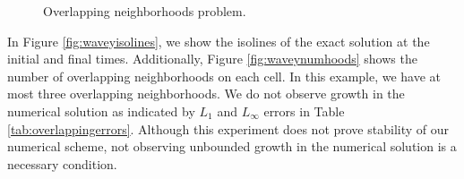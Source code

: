 \begin{figure}
\quad
{}
\caption{Overlapping neighborhoods problem.} \label{fig:overlappingneighborhoods}
\end{figure}

In Figure \ref{fig:waveyisolines}, we show the isolines of the exact solution at the initial and final times.  Additionally, Figure \ref{fig:waveynumhoods} shows the number of overlapping neighborhoods on each cell.  In this example, we have at most three overlapping neighborhoods.  We do not observe growth in the numerical solution as indicated by $L_1$ and $L_\infty$ errors in Table \ref{tab:overlappingerrors}.  Although this experiment does not prove stability of our numerical scheme, not observing unbounded growth in the numerical solution is a necessary condition.



